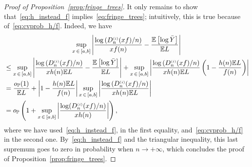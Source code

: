 \documentclass[10pt]{amsart}
\theoremstyle{definition}\newtheorem{defi}[theo]{Definition}\newtheorem{rema}[theo]{Remark}\newtheorem{exam}[theo]{Example}\newtheorem{exem}[theo]{Example}\newtheorem{nota}[theo]{Notation}
\newcommand{\sss}{\ensuremath{\scriptscriptstyle}}
\newcommand{\op}{{o_{\bbP}}}
\newcommand{\bbP}{\mathbb{P}}
\newcommand{\bbE}{\mathbb{E}}
\begin{document}
\begin{proof}[Proof of Proposition~\ref{prop:fringe_trees}]
It only remains to show that~\eqref{eq:h_instead_f} implies~\eqref{eq:fringe_trees}; intuitively, this is true because of~\eqref{eq:cvprob_h/f}. Indeed, we have
\begin{multline*}
\sup_{x\,\in\,[a,b]} \left|\frac{\log \left(D_n^{\sss (i)}(xf)/n\right)}{xf(n)}- \frac{\bbE\left[\log \bar Y\right]}{\bbE L}\right|\\
\begin{aligned}
&\leq \sup_{x\,\in\,[a,b]} \left|\frac{\log\left(D_n^{\sss (i)}(xf)/n\right)}{xh(n)\bbE L}- \frac{\bbE\left[\log \bar Y\right]}{\bbE L}\right| + \sup_{x\,\in\,[a,b]} \left|\frac{\log \left(D_n^{\sss (i)}(xf)/n\right)}{xh(n)\bbE L}\left(1-\frac{h(n)\bbE L}{f(n)}\right)\right|\\
&= \frac{\op(1)}{\bbE L} + \left|1-\frac{h(n)\bbE L}{f(n)}\right| \sup_{x\,\in\,[a,b]} \left|\frac{\log \left(D_n^{\sss (i)}(xf)/n\right)}{xh(n)\bbE L}\right|
\\
&= \op\left(1+\sup_{x\,\in\,[a,b]} \left|\frac{\log (D_n^{\sss (i)}(xf)/n)}{xh(n)}\right|\right),
\end{aligned}
\end{multline*}
where we have used~\eqref{eq:h_instead_f}, in the first equality, and~\eqref{eq:cvprob_h/f} in the second one. By~\eqref{eq:h_instead_f} and the triangular inequality, this last supremum goes to zero in probability when $n\to+\infty$, which concludes the proof of Proposition~\ref{prop:fringe_trees}.
\end{proof}
\end{document}
